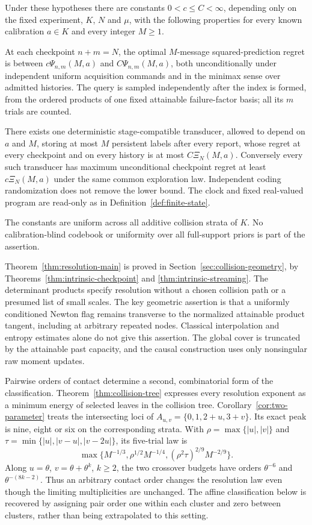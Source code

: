 \begin{theorem}\label{thm:resolution-main}
Under these hypotheses there are constants $0<c\le C<\infty$,
depending only on the fixed experiment, $K$, $N$ and $\mu$, with the
following properties for every known calibration $a\in K$ and every
integer $M\ge1$.

At each checkpoint $n+m=N$, the optimal $M$-message squared-prediction
regret is between $c\Psi_{n,m}(M,a)$ and $C\Psi_{n,m}(M,a)$,
both unconditionally under independent uniform acquisition commands and
in the minimax sense over admitted histories. The query is sampled
independently after the index is formed, from the ordered products of
one fixed attainable failure-factor basis; all its $m$ trials are counted.

There exists one deterministic stage-compatible transducer, allowed to
depend on $a$ and $M$, storing at most $M$ persistent labels after
every report, whose regret at every checkpoint and on every history is
at most $C\Xi_N(M,a)$. Conversely every such transducer has maximum
unconditional checkpoint regret at least $c\Xi_N(M,a)$ under the
same common exploration law. Independent coding randomization does not
remove the lower bound. The clock and fixed real-valued program are
read-only as in Definition~\ref{def:finite-state}.

The constants are uniform across all additive collision strata of $K$.
No calibration-blind codebook or uniformity over all full-support priors
is part of the assertion.
\end{theorem}

Theorem~\ref{thm:resolution-main} is proved in
Section~\ref{sec:collision-geometry}, by
Theorems~\ref{thm:intrinsic-checkpoint} and \ref{thm:intrinsic-streaming}.
The determinant products specify resolution without a chosen collision
path or a presumed list of small scales. The key geometric assertion is
that a uniformly conditioned Newton flag remains transverse to the
normalized attainable product tangent, including at arbitrary repeated
nodes. Classical interpolation and entropy estimates alone do not give
this assertion. The global cover is truncated by the attainable past
capacity, and the causal construction uses only nonsingular raw moment
updates.

Pairwise orders of contact determine a second, combinatorial form of the
classification. Theorem~\ref{thm:collision-tree} expresses every resolution
exponent as a minimum energy of selected leaves in the collision tree.
Corollary~\ref{cor:two-parameter} treats the intersecting loci of
$A_{u,v}=\{0,1,2+u,3+v\}$. Its exact peak is nine, eight or six on
the corresponding strata. With
$\rho=\max\{|u|,|v|\}$ and
$\tau=\min\{|u|,|v-u|,|v-2u|\}$, its five-trial law is
\[
 \max\{M^{-1/3},\rho^{1/2}M^{-1/4},
                     (\rho^2\tau)^{2/9}M^{-2/9}\}.
\]
Along $u=\theta$, $v=\theta+\theta^k$, $k\ge2$, the two crossover
budgets have orders $\theta^{-6}$ and $\theta^{-(8k-2)}$.
Thus an arbitrary contact order changes the resolution law even though
the limiting multiplicities are unchanged. The affine classification
below is recovered by assigning pair order one within each cluster and
zero between clusters, rather than being extrapolated to this setting.

